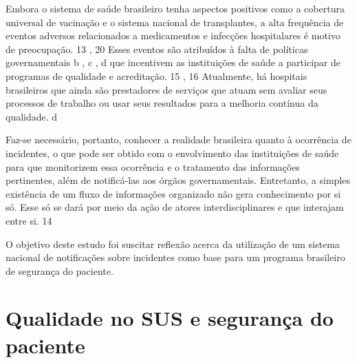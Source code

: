 \documentclass{article}
\begin{document}

Embora o sistema de saúde brasileiro tenha aspectos positivos como a cobertura universal de
        vacinação e o sistema nacional de transplantes, a alta frequência de eventos adversos
        relacionados a medicamentos e infecções hospitalares é motivo de preocupação. %
13%
,%
20%
 Esses eventos são atribuídos à falta de políticas governamentais %
b%
,%
c%
,%
d%
 que incentivem as instituições de saúde a participar de programas de qualidade e
        acreditação. %
15%
,%
16%
 Atualmente, há hospitais brasileiros que ainda são prestadores de serviços que atuam
        sem avaliar seus processos de trabalho ou usar seus resultados para a melhoria contínua da
        qualidade. %
d%


Faz-se necessário, portanto, conhecer a realidade brasileira quanto à ocorrência de
        incidentes, o que pode ser obtido com o envolvimento das instituições de saúde para que
        monitorizem essa ocorrência e o tratamento das informações pertinentes, além de notificá-las
        aos órgãos governamentais. Entretanto, a simples existência de um fluxo de informações
        organizado não gera conhecimento por si só. Esse só se dará por meio da ação de atores
        interdisciplinares e que interajam entre si. %
14%


O objetivo deste estudo foi suscitar reflexão acerca da utilização de um sistema nacional
        de notificações sobre incidentes como base para um programa brasileiro de segurança do
        paciente.

\section{%
Qualidade no SUS e segurança do paciente}
\end{document}
